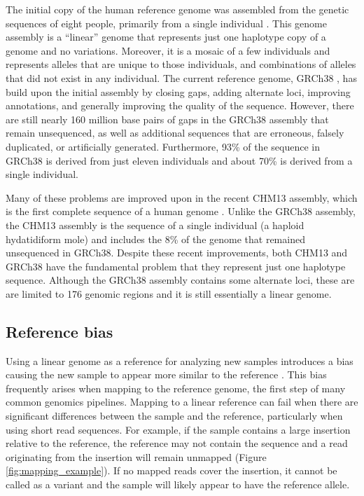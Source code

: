 \documentclass[11pt]{ucscthesis}
\begin{document}
The initial copy of the human reference genome was assembled from the genetic sequences of eight people, primarily from a single individual \cite{lander_initial_2001}.
This genome assembly is a ``linear'' genome that represents just one haplotype copy of a genome and no variations.
Moreover, it is a mosaic of a few individuals and represents alleles that are unique to those individuals, and combinations of alleles that did not exist in any individual.
The current reference genome, GRCh38 \cite{schneider_evaluation_2017}, has build upon the initial assembly by closing gaps, adding alternate loci, improving annotations, and generally improving the quality of the sequence.
However, there are still nearly 160 million base pairs of gaps in the GRCh38 assembly that remain unsequenced, as well as additional sequences that are erroneous, falsely duplicated, or artificially generated\cite{schneider_evaluation_2017,nurk_complete_2022}.
Furthermore, 93\% of the sequence in GRCh38 is derived from just eleven individuals and about 70\% is derived from a single individual.

Many of these problems are improved upon in the recent CHM13 assembly, which is the first complete sequence of a human genome \cite{nurk_complete_2022}.
Unlike the GRCh38 assembly, the CHM13 assembly is the sequence of a single individual (a haploid hydatidiform mole) and includes the 8\% of the genome that remained unsequenced in GRCh38\cite{nurk_complete_2022}.
Despite these recent improvements, both CHM13 and GRCh38 have the fundamental problem that they represent just one haplotype sequence.
Although the GRCh38 assembly contains some alternate loci, these are are limited to 176 genomic regions\cite{schneider_evaluation_2017} and it is still essentially a linear genome.


\subsection{Reference bias}

Using a linear genome as a reference for analyzing new samples introduces a bias causing the new sample to appear more similar to the reference \cite{ballouz_is_2019,noauthor_computational_2016,eizenga_pangenome_2020}.
This bias frequently arises when mapping to the reference genome, the first step of many common genomics pipelines.
Mapping to a linear reference can fail when there are significant differences between the sample and the reference, particularly when using short read sequences.
For example, if the sample contains a large insertion relative to the reference, the reference may not contain the sequence and a read originating from the insertion will remain unmapped (Figure \ref{fig:mapping_example}).
If no mapped reads cover the insertion, it cannot be called as a variant and the sample will likely appear to have the reference allele.
\end{document}

